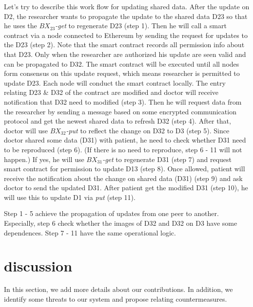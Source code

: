 \documentclass[conference]{IEEEtran}
\begin{document}
Let's try to describe this work flow for updating shared data. After the update on D2, the researcher wants to propagate the update to the shared data D23 so that he uses the \emph{$BX_{23}$-get} to regenerate D23 (step 1). Then he will call a smart contract via a node connected to Ethereum by sending the request for updates to the D23 (step 2). Note that the smart contract records all permission info about that D23. Only when the researcher are authorized his update are seen valid and can be propagated to D32. The smart contract will be executed until all nodes form consensus on this update request, which means researcher is permitted to update D23. Each node will conduct the smart contract locally. The entry relating D23 \& D32 of the contract are modified and doctor will receive notification that D32 need to modified (step 3). Then he will request data from the researcher by sending a message based on some encrypted communication protocol and get the newest shared data to refresh D32 (step 4). After that, doctor will use \emph{$BX_{32}$-put} to reflect the change on D32 to D3 (step 5). Since doctor shared some data (D31) with patient, he need to check whether D31 need to be reproduced (step 6). (If there is no need to reproduce, step 6 - 11 will not happen.) If yes, he will use \emph{$BX_{31}$-get} to regenerate D31 (step 7) and request smart contract for permission to update D13 (step 8). Once allowed, patient will receive the notification about the change on shared data (D31) (step 9) and ask doctor to send the updated D31. After patient get the modified D31 (step 10), he will use this to update D1 via \emph{put} (step 11).  

Step 1 - 5 achieve the propagation of updates from one peer to another. Especially, step 6 check whether the images of D32 and D32 on D3 have some dependences. Step 7 - 11 have the same operational logic.

%
%
%


\section{discussion}
\label{discuss}
In this section, we add more details about our contributions. In addition, we identify some threats to our system and propose relating countermeasures.
\end{document}
